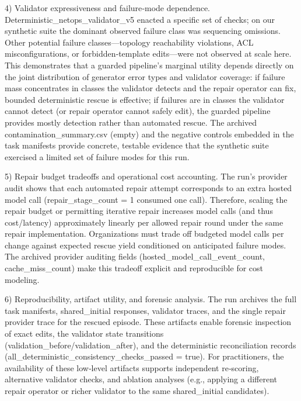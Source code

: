 \documentclass[conference]{IEEEtran}
\begin{document}
4) Validator expressiveness and failure‑mode dependence. Deterministic\_netops\_validator\_v5 enacted a specific set of checks; on our synthetic suite the dominant observed failure class was sequencing omissions. Other potential failure classes---topology reachability violations, ACL misconfigurations, or forbidden‑template edits---were not observed at scale here. This demonstrates that a guarded pipeline's marginal utility depends directly on the joint distribution of generator error types and validator coverage: if failure mass concentrates in classes the validator detects and the repair operator can fix, bounded deterministic rescue is effective; if failures are in classes the validator cannot detect (or repair operator cannot safely edit), the guarded pipeline provides mostly detection rather than automated rescue. The archived contamination\_summary.csv (empty) and the negative controls embedded in the task manifests provide concrete, testable evidence that the synthetic suite exercised a limited set of failure modes for this run.

5) Repair budget tradeoffs and operational cost accounting. The run's provider audit shows that each automated repair attempt corresponds to an extra hosted model call (repair\_stage\_count = 1 consumed one call). Therefore, scaling the repair budget or permitting iterative repair increases model calls (and thus cost/latency) approximately linearly per allowed repair round under the same repair implementation. Organizations must trade off budgeted model calls per change against expected rescue yield conditioned on anticipated failure modes. The archived provider auditing fields (hosted\_model\_call\_event\_count, cache\_miss\_count) make this tradeoff explicit and reproducible for cost modeling.

6) Reproducibility, artifact utility, and forensic analysis. The run archives the full task manifests, shared\_initial responses, validator traces, and the single repair provider trace for the rescued episode. These artifacts enable forensic inspection of exact edits, the validator state transitions (validation\_before/validation\_after), and the deterministic reconciliation records (all\_deterministic\_consistency\_checks\_passed = true). For practitioners, the availability of these low‑level artifacts supports independent re‑scoring, alternative validator checks, and ablation analyses (e.g., applying a different repair operator or richer validator to the same shared\_initial candidates).
\end{document}
